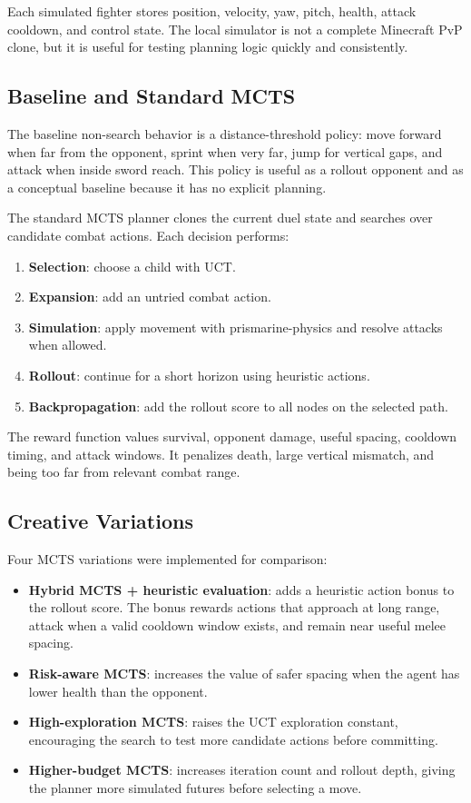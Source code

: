 \documentclass[11pt]{article}
\begin{document}
Each simulated fighter stores position, velocity, yaw, pitch, health, attack cooldown, and control state. The local simulator is not a complete Minecraft PvP clone, but it is useful for testing planning logic quickly and consistently.

\subsection{Baseline and Standard MCTS}

The baseline non-search behavior is a distance-threshold policy: move forward when far from the opponent, sprint when very far, jump for vertical gaps, and attack when inside sword reach. This policy is useful as a rollout opponent and as a conceptual baseline because it has no explicit planning.

The standard MCTS planner clones the current duel state and searches over candidate combat actions. Each decision performs:
\begin{enumerate}
  \item \textbf{Selection}: choose a child with UCT.
  \item \textbf{Expansion}: add an untried combat action.
  \item \textbf{Simulation}: apply movement with prismarine-physics and resolve attacks when allowed.
  \item \textbf{Rollout}: continue for a short horizon using heuristic actions.
  \item \textbf{Backpropagation}: add the rollout score to all nodes on the selected path.
\end{enumerate}

The reward function values survival, opponent damage, useful spacing, cooldown timing, and attack windows. It penalizes death, large vertical mismatch, and being too far from relevant combat range.

\subsection{Creative Variations}

Four MCTS variations were implemented for comparison:
\begin{itemize}
  \item \textbf{Hybrid MCTS + heuristic evaluation}: adds a heuristic action bonus to the rollout score. The bonus rewards actions that approach at long range, attack when a valid cooldown window exists, and remain near useful melee spacing.
  \item \textbf{Risk-aware MCTS}: increases the value of safer spacing when the agent has lower health than the opponent.
  \item \textbf{High-exploration MCTS}: raises the UCT exploration constant, encouraging the search to test more candidate actions before committing.
  \item \textbf{Higher-budget MCTS}: increases iteration count and rollout depth, giving the planner more simulated futures before selecting a move.
\end{itemize}
\end{document}
